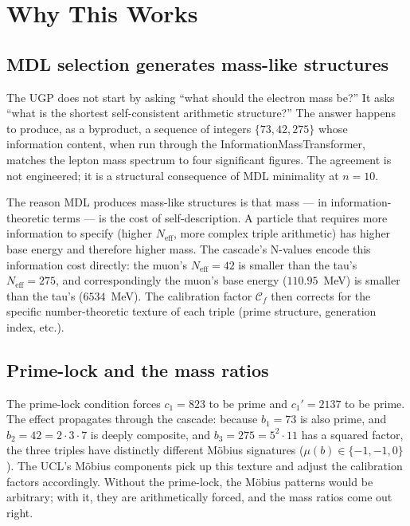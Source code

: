 \documentclass[11pt,a4paper]{article}
\newcommand{\Neff}{N_{\mathrm{eff}}}
\begin{document}
\section{Why This Works}
\label{sec:why}

\subsection{MDL selection generates mass-like structures}

The UGP does not start by asking ``what should the electron mass be?''  It asks
``what is the shortest self-consistent arithmetic structure?''  The answer happens to
produce, as a byproduct, a sequence of integers $\{73, 42, 275\}$ whose information
content, when run through the InformationMassTransformer, matches the lepton mass
spectrum to four significant figures.  The agreement is not engineered; it is a
structural consequence of MDL minimality at $n = 10$.

The reason MDL produces mass-like structures is that mass --- in information-theoretic
terms --- is the cost of self-description.  A particle that requires more information
to specify (higher $\Neff$, more complex triple arithmetic) has higher base energy
and therefore higher mass.  The cascade's N-values encode this information cost
directly: the muon's $\Neff = 42$ is smaller than the tau's $\Neff = 275$, and
correspondingly the muon's base energy ($110.95$~MeV) is smaller than the tau's
($6534$~MeV).  The calibration factor $\mathcal{C}_f$ then corrects for the specific
number-theoretic texture of each triple (prime structure, generation index, etc.).

\subsection{Prime-lock and the mass ratios}

The prime-lock condition forces $c_1 = 823$ to be prime and $c_1' = 2137$ to be prime.
The effect propagates through the cascade: because $b_1 = 73$ is also prime, and
$b_2 = 42 = 2\cdot3\cdot7$ is deeply composite, and $b_3 = 275 = 5^2\cdot11$ has
a squared factor, the three triples have distinctly different M\"{o}bius signatures
($\mu(b) \in \{-1, -1, 0\}$).  The UCL's M\"{o}bius components pick up this texture
and adjust the calibration factors accordingly.  Without the prime-lock, the
M\"{o}bius patterns would be arbitrary; with it, they are arithmetically forced, and
the mass ratios come out right.
\end{document}

